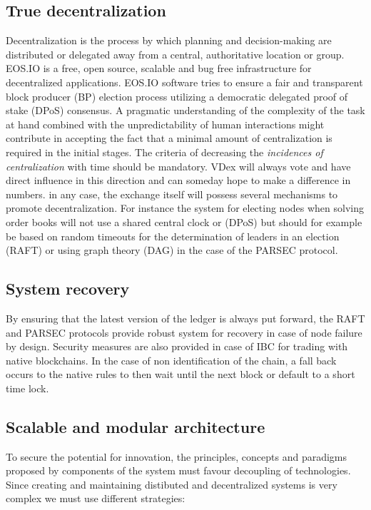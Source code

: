 \documentclass[]{article}
\begin{document}
	\subsection{True decentralization}
	 Decentralization is the process by which planning and decision-making are distributed or delegated away 
	 from a central, authoritative location or group.
	 EOS.IO is a free, open source, scalable and bug free infrastructure for decentralized applications. 
	 EOS.IO software tries to ensure a fair and transparent block producer (BP) election process 
	 utilizing a democratic delegated proof of stake (DPoS) consensus.
	 A pragmatic understanding of the complexity of the task at hand combined with the unpredictability of human interactions 
	 might contribute in accepting the fact that a minimal amount of centralization is required in the initial stages.
	 The criteria of decreasing the \textit{incidences of centralization} with time should be mandatory. 
	 VDex will always vote and have direct influence in this direction and can someday hope to make a difference in numbers.
	 in any case, the exchange itself will possess several mechanisms to promote decentralization. 
	 For instance the system for electing nodes when solving order books will not use a shared central clock or (DPoS) 
	 but should for example be based on random timeouts for the determination of leaders in an election (RAFT) 
	 or using graph theory (DAG) in the case of the PARSEC protocol.
	 
	\subsection{System recovery}
	By ensuring that the latest version of the ledger is always put forward, 
	the RAFT and PARSEC protocols provide robust system for recovery in case of node failure by design.
	Security measures are also provided in case of IBC for trading with native blockchains. 
	In the case of non identification of the chain, a fall back occurs to the native rules to then  wait until the next block or default to a short time lock.
	
	\subsection{Scalable and modular architecture}
	To secure the potential for innovation, the principles, 
	concepts and paradigms proposed by components of the system
	must favour decoupling of technologies. 
	Since creating and maintaining distibuted and decentralized systems
	is very complex we must use different strategies: 
\end{document}
